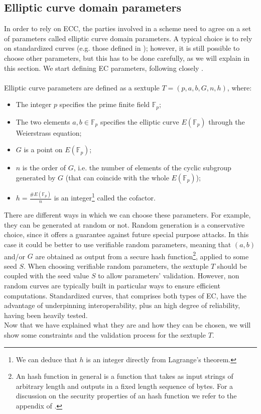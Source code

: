 \subsection{Elliptic curve domain parameters}
\label{ecparam}
In order to rely on ECC, the parties involved in a scheme need to agree on a set of parameters called elliptic curve domain parameters. A typical choice is to rely on standardized curves (e.g. those defined in \cite{RefWork:3}); however, it is still possible to choose other parameters, but this has to be done carefully, as we will explain in this section. We start defining EC parameters, following closely \cite{RefWork:2}.
\\
\\
Elliptic curve parameters are defined as a sextuple $T = (p, a, b, G, n, h)$, where:
\begin{itemize}
	\item The integer $p$ specifies the prime finite field $\mathbb{F}_p$;
	\item The two elements $a, b \in \mathbb{F}_p$ specifies the elliptic curve $E(\mathbb{F}_p)$ through the Weierstrass equation;
	\item $G$ is a point on $E(\mathbb{F}_p)$;
	\item $n$ is the order of $G$, i.e. the number of elements of the cyclic subgroup generated by $G$ (that can coincide with the whole $E(\mathbb{F}_p)$);
	\item $h = \frac{\#E(\mathbb{F}_p)}{n}$ is an integer\footnote{We can deduce that $h$ is an integer directly from Lagrange's theorem.} called the cofactor. 
\end{itemize}
There are different ways in which we can choose these parameters. For example, they can be generated at random or not. Random generation is a conservative choice, since it offers a guarantee against future special purpose attacks. In this case it could be better to use verifiable random parameters, meaning that $(a, b)$ and/or $G$ are obtained as output from a secure hash function\footnote{An hash function in general is a function that takes as input strings of arbitrary length and outputs in a fixed length sequence of bytes. For a discussion on the security properties of an hash function we refer to the appendix of \cite{RefWork:2}.}, applied to some seed $S$. When choosing verifiable random parameters, the sextuple $T$ should be coupled with the seed value $S$ to allow parameters' validation. However, non random curves are typically built in particular ways to ensure efficient computations. Standardized curves, that comprises both types of EC, have the advantage of underpinning interoperability, plus an high degree of reliability, having been heavily tested.
\\
Now that we have explained what they are and how they can be chosen, we will show some constraints and the validation process for the sextuple $T$.

